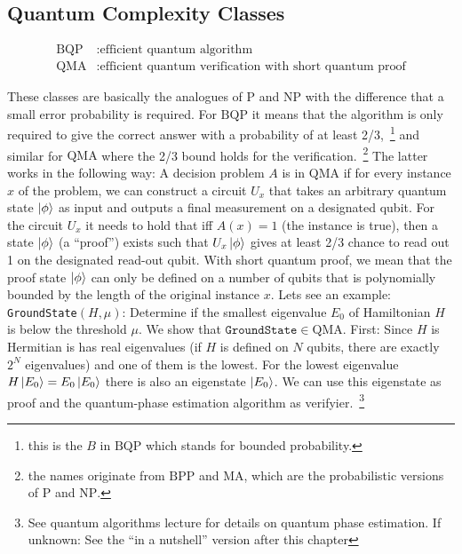 \subsection{Quantum Complexity Classes}

\begin{def*}
\begin{align*}
    {\mathrm{BQP}} &: \text{efficient quantum algorithm}\\
    {\mathrm{QMA}} &: \text{efficient quantum verification with short quantum proof}
\end{align*}
\end{def*}

These classes are basically the analogues of $\mathrm{P}$ and $\mathrm{NP}$ with the difference that a small error probability is required. For $\mathrm{BQP}$ it means that the algorithm is only required to give the correct answer with a probability of at least 2/3,~\footnote{this is the $B$ in $\mathrm{BQP}$ which stands for bounded probability.} and similar for $\mathrm{QMA}$ where the 2/3 bound holds for the verification.~\footnote{the names originate from $\mathrm{BPP}$ and $\mathrm{MA}$, which are the probabilistic versions of $\mathrm{P}$ and $\mathrm{NP}$.} The latter works in the following way: A decision problem $A$ is in $\mathrm{QMA}$ if for every instance $x$ of the problem, we can construct a circuit $U_x$ that takes an arbitrary quantum state $\ket{\phi}$ as input and outputs a final measurement on a designated qubit. For the circuit $U_x$ it needs to hold that iff $A(x)=1$ (the instance is true), then a state $\ket{\phi}$ (a ``proof'') exists such that $U_x\ket{\phi}$ gives at least 2/3 chance to read out 1 on the designated read-out qubit. With short quantum proof, we mean that the proof state $\ket{\phi}$ can only be defined on a number of qubits that is polynomially bounded by the length of the original instance $x$. Lets see an example:\\

\texttt{GroundState}$(H, \mu)$: Determine if the smallest eigenvalue $E_0$ of Hamiltonian $H$ is below the threshold $\mu$. We show that $\texttt{GroundState}\in \mathrm{QMA}$. First: Since $H$ is Hermitian is has real eigenvalues (if $H$ is defined on $N$ qubits, there are exactly $2^N$ eigenvalues) and one of them is the lowest. For the lowest eigenvalue $H\ket{E_0} = E_0 \ket{E_0}$ there is also an eigenstate $\ket{E_0}$. We can use this eigenstate as proof and the quantum-phase estimation algorithm as verifyier.~\footnote{See quantum algorithms lecture for details on quantum phase estimation. If unknown: See the ``in a nutshell'' version after this chapter}  

